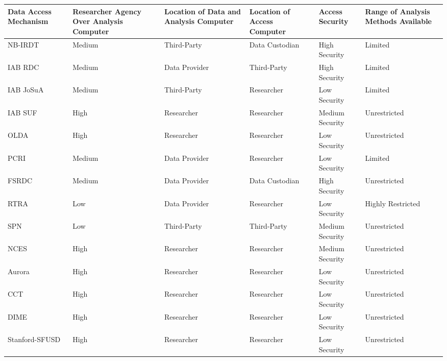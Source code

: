 \begin{tabulary}{\textwidth}{LLLLLL}
  \toprule
  Data Access Mechanism& 
  Researcher Agency Over Analysis Computer& 
  Location of Data and Analysis Computer& 
  Location of Access Computer& 
  Access Security& 
  Range of Analysis Methods Available\\ 
  \midrule
NB-IRDT & Medium & Third-Party & Data Custodian & High Security & Limited \\ 
  IAB RDC & Medium & Data Provider & Third-Party & High Security & Limited \\ 
  IAB JoSuA & Medium & Third-Party & Researcher & Low Security & Limited \\ 
  IAB SUF & High & Researcher & Researcher & Medium Security & Unrestricted \\ 
  OLDA & High & Researcher & Researcher & Low Security & Unrestricted \\ 
  PCRI & Medium & Data Provider & Researcher & Low Security & Limited \\ 
  FSRDC & Medium & Data Provider & Data Custodian & High Security & Unrestricted \\ 
  RTRA & Low & Data Provider & Researcher & Low Security & Highly Restricted \\ 
  SPN & Low & Third-Party & Third-Party & Medium Security & Unrestricted \\ 
  NCES & High & Researcher & Researcher & Medium Security & Unrestricted \\ 
  Aurora & High & Researcher & Researcher & Low Security & Unrestricted \\ 
  CCT & High & Researcher & Researcher & Low Security & Unrestricted \\ 
  DIME & High & Researcher & Researcher & Low Security & Unrestricted \\ 
  Stanford-SFUSD & High & Researcher & Researcher & Low Security & Unrestricted \\ 
   \bottomrule
\end{tabulary}
